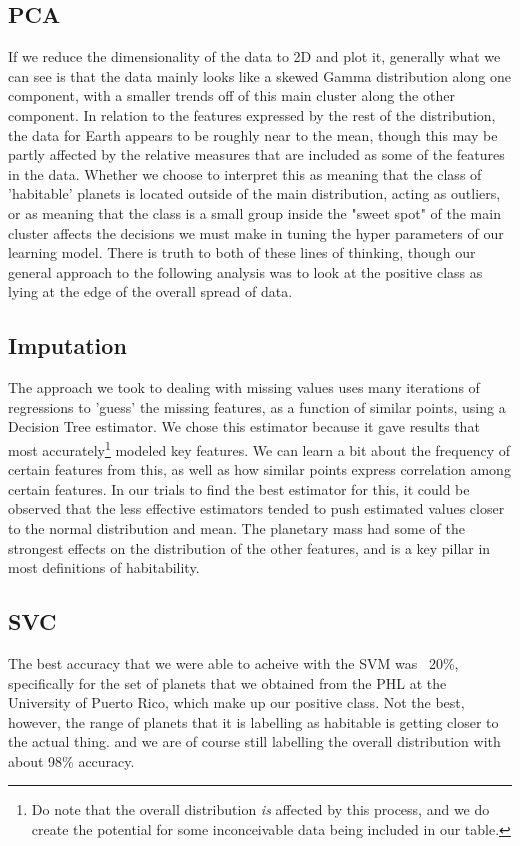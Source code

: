 \documentclass[11.5pt]{article}
\begin{document}
\subsection{PCA}
If we reduce the dimensionality of the data to 2D and plot it, generally what we can see is that the data mainly looks like a skewed Gamma distribution along one component, with a smaller trends off of this main cluster along the other component.
In relation to the features expressed by the rest of the distribution, the data for Earth appears to be roughly near to the mean, though this may be partly affected by the relative measures that are included as some of the features in the data. Whether we choose to interpret this as meaning that the class of 'habitable' planets is located outside of the main distribution, acting as outliers, or as meaning that the class is a small group inside the "sweet spot" of the main cluster affects the decisions we must make in tuning the hyper parameters of our learning model. There is truth to both of these lines of thinking, though our general approach to the following analysis was to look at the positive class as lying at the edge of the overall spread of data.

\subsection{Imputation}
The approach we took to dealing with missing values uses many iterations of regressions to 'guess' the missing features, as a function of similar points, using a Decision Tree estimator. We chose this estimator because it gave results that most accurately\footnote{Do note that the overall distribution \emph{is} affected by this process, and we do create the potential for some inconceivable data being included in our table.} modeled key features. We can learn a bit about the frequency of certain features from this, as well as how similar points express correlation among certain features. In our trials to find the best estimator for this, it could be observed that the less effective estimators tended to push estimated values closer to the normal distribution and mean. The planetary mass had some of the strongest effects on the distribution of the other features, and is a key pillar in most definitions of habitability.

\subsection{SVC}
The best accuracy that we were able to acheive with the SVM was ~20\%, specifically for the set of planets that we obtained from the PHL at the University of Puerto Rico, which make up our positive class. Not the best, however, the range of planets that it is labelling as habitable is getting closer to the actual thing. and we are of course still labelling the overall distribution with about 98\% accuracy.
\end{document}
